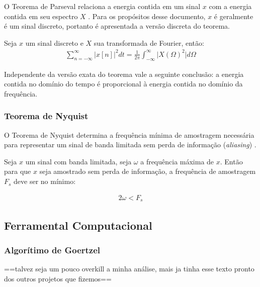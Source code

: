 O Teorema de Parseval relaciona a energia contida em um sinal $x$ com a energia contida em seu espectro $X$ \cite{Oppenheim1997}. Para os propósitos desse documento, $x$ é geralmente é um sinal discreto, portanto é apresentada a versão discreta do teorema. 

\begin{thm}[Parseval]
    Seja $x$ um sinal discreto e $X$ sua transformada de Fourier, então:
    \begin{align}
    \label{eq:Parseval}
    \sum_{n=-\infty}^{\infty} \rvert x[n] \lvert^2 dt = \frac{1}{2\pi}\int_{-\infty}^{\infty} \rvert X(\Omega)^2 \lvert d\Omega
    \end{align}
\end{thm}

Independente da versão exata do teorema vale a seguinte conclusão: a energia contida no domínio do tempo é proporcional à energia contida no domínio da frequência.

\subsubsection{Teorema de Nyquist}

O Teorema de Nyquist determina a frequência mínima de amostragem necessária para representar um sinal de banda limitada sem perda de informação (\textit{aliasing}) \cite{Oppenheim1997}. 

\begin{thm}[Nyquist]
Seja $x$ um sinal com banda limitada, seja $\omega$ a frequência máxima de $x$. Então para que $x$ seja amostrado sem perda de informação, a frequência de amostragem $F_s$ deve ser no mínimo:

\begin{align}
    \label{eq:Nyquist}
    2\omega < F_s
\end{align}
\end{thm}

\subsection{Ferramental Computacional}

\subsubsection{Algorítimo de Goertzel}
\label{sub:Goertzel}

==talvez seja um pouco overkill a minha análise, mais ja tinha esse texto pronto dos outros projetos que fizemos==

